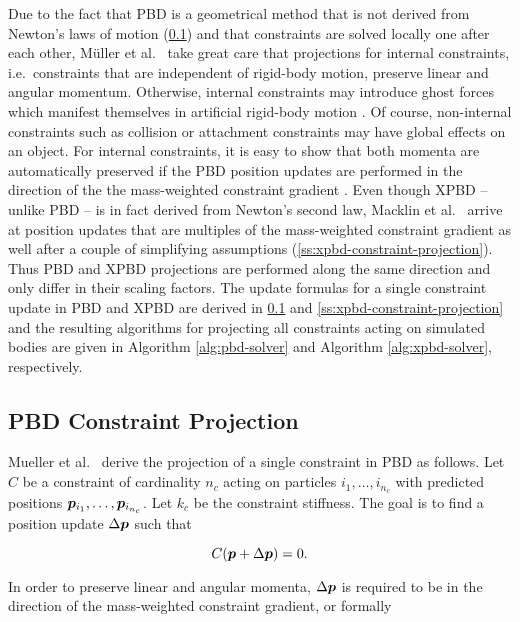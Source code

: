 Due to the fact that PBD is a geometrical method that is not derived from Newton's laws of motion (\cref{ss:pbd-constraint-projection}) and that 
constraints are solved locally one after each 
other, Müller et al.\ \cite{mueller2006} take great care that projections for internal constraints, i.e.\ constraints that are independent of rigid-body 
motion, preserve linear and angular momentum. Otherwise, internal constraints may introduce ghost forces which manifest themselves in artificial 
rigid-body motion \cite{mueller2006}. Of course, non-internal constraints such as collision or 
attachment constraints may have global effects on an object. For internal constraints, it is easy to show that both momenta are automatically preserved 
if the PBD position updates are performed in the direction of the the mass-weighted constraint gradient \cite{mueller2006}. Even though XPBD -- unlike 
PBD -- is in fact derived from Newton's second law, Macklin et al.\ \cite{macklin2016} arrive at position updates that are multiples of the mass-weighted 
constraint gradient as well after a couple of simplifying assumptions (\cref{ss:xpbd-constraint-projection}). Thus PBD and XPBD projections 
are performed along the same direction and only differ in their scaling factors. The update formulas for a single constraint update in PBD and XPBD are 
derived in \cref{ss:pbd-constraint-projection} and \cref{ss:xpbd-constraint-projection} and the resulting algorithms for projecting all constraints 
acting on simulated bodies are given in Algorithm \ref{alg:pbd-solver} and Algorithm \ref{alg:xpbd-solver}, respectively.

\subsection{PBD Constraint Projection}\label{ss:pbd-constraint-projection}

Mueller et al.\ \cite{mueller2006} derive the projection of a single constraint in PBD as follows. Let $C$ be a constraint of cardinality $n_c$ 
acting on particles $i_1, \ldots, i_{n_c}$ with predicted positions $\bm{p}_{i_1}, \ldots, \bm{p}_{i_{n_c}}$. Let $k_c$ be the constraint 
stiffness. The goal is to find a position update $\Delta \bm{p}$ such that 

\begin{equation}\label{eq:pbd-delta}
    C(\bm{p} + \Delta \bm{p}) = 0.
\end{equation}

\noindent In order to preserve linear and angular momenta, $\Delta \bm{p}$ is required to be in the direction of the mass-weighted constraint 
gradient, or formally

